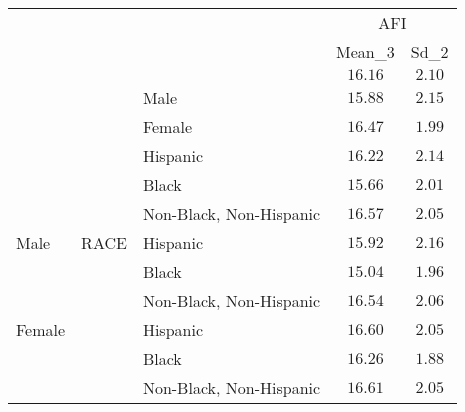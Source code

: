 \begin{tabular}{lllcc}
\hline
& & & \multicolumn{2}{c}{AFI} \\ 
 &  &  & Mean_3 & \multicolumn{1}{c}{Sd_2} \\ 
\hline
 &  &   & $16.16$ & $2.10$ \\
 &  & \nopagebreak Male  & $15.88$ & $2.15$ \\
 &  & \nopagebreak Female  & $16.47$ & $1.99$ \\
 &  & \nopagebreak Hispanic  & $16.22$ & $2.14$ \\
 &  & \nopagebreak Black  & $15.66$ & $2.01$ \\
 &  & \nopagebreak Non-Black, Non-Hispanic  & $16.57$ & $2.05$ \\
\nopagebreak Male & RACE & \nopagebreak Hispanic  & $15.92$ & $2.16$ \\
 &  & \nopagebreak Black  & $15.04$ & $1.96$ \\
 &  & \nopagebreak Non-Black, Non-Hispanic  & $16.54$ & $2.06$ \\
\nopagebreak Female &  & \nopagebreak Hispanic  & $16.60$ & $2.05$ \\
 &  & \nopagebreak Black  & $16.26$ & $1.88$ \\
 &  & \nopagebreak Non-Black, Non-Hispanic  & $16.61$ & $2.05$ \\
\hline 
\end{tabular}
